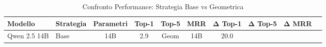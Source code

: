 \begin{table}[H]
\centering
\caption{Confronto Performance: Strategia Base vs Geometrica}
\label{tab:dual_strategy_comparison}
\begin{tabular}{llcccccccc}
\toprule
\textbf{Modello} & \textbf{Strategia} & \textbf{Parametri} & \textbf{Top-1} & \textbf{Top-5} & \textbf{MRR} & \textbf{Δ Top-1} & \textbf{Δ Top-5} & \textbf{Δ MRR} \\
\midrule
Qwen 2.5 14B & Base & 14B & 2.9%
 & Geom & 14B & 20.0%
\bottomrule
\end{tabular}
\end{table}
